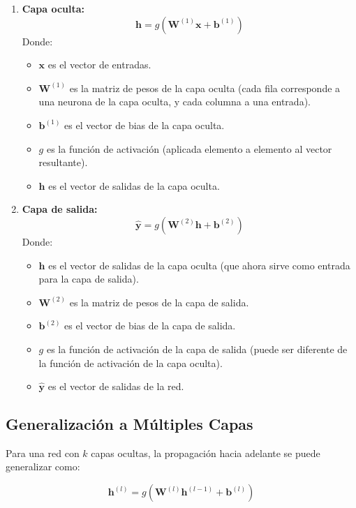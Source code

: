 \documentclass{article}
\begin{document}
\begin{enumerate}
    \item \textbf{Capa oculta:}
        \[
        \mathbf{h} = g(\mathbf{W}^{(1)} \mathbf{x} + \mathbf{b}^{(1)})
        \]
        Donde:
        \begin{itemize}
            \item \(\mathbf{x}\) es el vector de entradas.
            \item \(\mathbf{W}^{(1)}\) es la matriz de pesos de la capa oculta (cada fila corresponde a una neurona de la capa oculta, y cada columna a una entrada).
            \item \(\mathbf{b}^{(1)}\) es el vector de bias de la capa oculta.
            \item \(g\) es la función de activación (aplicada elemento a elemento al vector resultante).
            \item \(\mathbf{h}\) es el vector de salidas de la capa oculta.
        \end{itemize}
    \item \textbf{Capa de salida:}
        \[
        \hat{\mathbf{y}} = g(\mathbf{W}^{(2)} \mathbf{h} + \mathbf{b}^{(2)})
        \]
        Donde:
         \begin{itemize}
            \item \(\mathbf{h}\) es el vector de salidas de la capa oculta (que ahora sirve como entrada para la capa de salida).
            \item \(\mathbf{W}^{(2)}\) es la matriz de pesos de la capa de salida.
            \item \(\mathbf{b}^{(2)}\) es el vector de bias de la capa de salida.
            \item \(g\) es la función de activación de la capa de salida (puede ser diferente de la función de activación de la capa oculta).
            \item \(\hat{\mathbf{y}}\) es el vector de salidas de la red.
        \end{itemize}

\end{enumerate}

\subsection{Generalización a Múltiples Capas}
Para una red con \(k\) capas ocultas, la propagación hacia adelante se puede generalizar como:

\[
\mathbf{h}^{(l)} = g(\mathbf{W}^{(l)} \mathbf{h}^{(l-1)} + \mathbf{b}^{(l)})
\]
\end{document}
